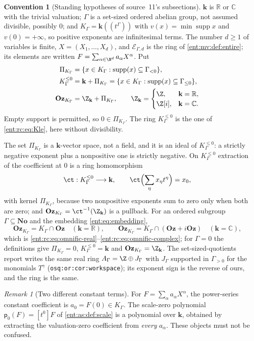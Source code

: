 \documentclass[11pt]{article}
\theoremstyle{plain}
\theoremstyle{plain}
\theoremstyle{plain}
\theoremstyle{definition}
\theoremstyle{definition}
\newtheorem{convention}[convention]{Convention}
\theoremstyle{definition}
\theoremstyle{definition}
\theoremstyle{remark}
\newtheorem{remark}[remark]{Remark}
\newcommand{\C}{\mathbb C}\newcommand{\R}{\mathbb R}
\newcommand{\No}{\mathbf{No}}
\newcommand{\K}{K_\Gamma}\newcommand{\KD}{K_\Delta}
\DeclareMathOperator{\supp}{supp}\DeclareMathOperator{\lc}{lc}
\newcommand{\kk}{\mathbf k}\newcommand{\PP}{\mathbb P}
\newcommand{\Oz}{\mathbf{Oz}}\newcommand{\Ed}{\mathcal E_{\Gamma,d}}
\newcommand{\Kle}{K_\Gamma^{\le0}}\DeclareMathOperator{\Jac}{Jac}
\newcommand{\Zk}{\Z_{\kk}}\newcommand{\OzK}{\Oz_{\K}}
\newcommand{\PiK}{\Pi_{\K}}\newcommand{\pg}{\mathsf p}
\begin{document}
\begin{convention}[Standing hypotheses of source~11's subsections]
\label{ent:as:conv:standing}
$\kk$ is $\R$ or $\C$ with the trivial valuation; $\Gamma$ is a set-sized
ordered abelian group, not assumed divisible, possibly $0$; and
$\K=\kk((t^\Gamma))$ with $v(x)=\min\supp x$ and $v(0)=+\infty$, so positive
exponents are infinitesimal terms. The number $d\ge1$ of variables is finite,
$X=(X_1,\ldots,X_d)$, and $\Ed$ is the ring of \cref{ent:mv:def:entire}; its
elements are written $F=\sum_{\alpha\in\N^d}a_\alpha X^\alpha$. Put
\begin{align}
 \PiK&=\{x\in\K:\supp(x)\subseteq\Gamma_{<0}\},\label{ent:as:eq:pi}\\
 \Kle&=\kk+\PiK=\{x\in\K:\supp(x)\subseteq\Gamma_{\le0}\},\label{ent:as:eq:B}\\
 \OzK&=\Zk+\PiK,\qquad
 \Zk=\begin{cases}\Z,&\kk=\R,\\ \Z[i],&\kk=\C.\end{cases}\label{ent:as:eq:A}
\end{align}
Empty support is permitted, so $0\in\PiK$. The ring $\Kle$ is the one of
\eqref{ent:rc:eq:Kle}, here without divisibility.
\end{convention}

The set $\PiK$ is a $\kk$-vector space, not a field, and it is an ideal of
$\Kle$: a strictly negative exponent plus a nonpositive one is strictly
negative. On $\Kle$ extraction of the coefficient at $0$ is a ring
homomorphism
\[
 \ct:\Kle\longrightarrow\kk,\qquad
 \ct\Bigl(\sum_\eta x_\eta t^\eta\Bigr)=x_0,
\]
with kernel $\PiK$, because two nonpositive exponents sum to zero only when
both are zero; and $\OzK=\ct^{-1}(\Zk)$ is a pullback. For an ordered subgroup
$\Gamma\subseteq\No$ and the embedding \eqref{ent:eq:embedding},
\[
 \OzK=\K\cap\Oz\quad(\kk=\R),\qquad
 \OzK=\K\cap(\Oz+i\Oz)\quad(\kk=\C),
\]
which is \eqref{ent:rc:eq:omnific-real}--\eqref{ent:rc:eq:omnific-complex}; for
$\Gamma=0$ the definitions give $\PiK=0$, $\Kle=\kk$ and $\OzK=\Zk$. The
set-sized-quotients report writes the same real ring $A_\Gamma=\Z\oplus
J_\Gamma$ with $J_\Gamma$ supported in $\Gamma_{>0}$ for the monomials $T^\gamma$
(\texttt{osq:or:cor:workspace}); its exponent sign is the reverse of ours, and
the ring is the same.

\begin{remark}[Two different constant terms]\label{ent:as:rem:two-constants}
For $F=\sum_\alpha a_\alpha X^\alpha$, the power-series constant coefficient is
$a_0=F(0)\in\K$. The scale-zero polynomial $\pg_0(F)=[t^0]F$ of
\cref{ent:as:def:scale} is a polynomial over $\kk$, obtained by extracting the
valuation-zero coefficient from \emph{every} $a_\alpha$. These objects must not
be confused.
\end{remark}
\end{document}
